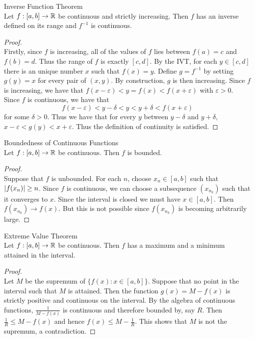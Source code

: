 \documentclass[a4paper]{article}
\begin{document}
\begin{prp}{Inverse Function Theorem}{}\\ Let $f:[a,b]\to\mathbb{R}$ be continuous and strictly increasing. Then $f$ has an inverse defined on its range and $f^{-1}$ is continuous. 
\begin{proof}\\ Firstly, since $f$ is increasing, all of the values of $f$ lies between $f(a)=c$ and $f(b)=d$. Thus the range of $f$ is exactly $[c,d]$. By the IVT, for each $y\in[c,d]$ there is an unique number $x$ such that $f(x)=y$. Define $g=f^{-1}$ by setting $g(y)=x$ for every pair of $(x,y)$. By construction, $g$ is then increasing. Since $f$ is increasing, we have that $f(x-\varepsilon)<y=f(x)<f(x+\varepsilon)$ with $\varepsilon>0$. Since $f$ is continuous, we have that $$f(x-\varepsilon)<y-\delta<y<y+\delta<f(x+\varepsilon)$$ for some $\delta>0$. Thus we have that for every $y$ between $y-\delta$ and $y+\delta$, $x-\varepsilon<g(y)<x+\varepsilon$. Thus the definition of continuity is satisfied. 
\end{proof}
\end{prp}

\begin{thm}{Boundedness of Continuous Functions}{}\\ Let $f:[a,b]\to\mathbb{R}$ be continuous. Then $f$ is bounded. 
\begin{proof}\\ Suppose that $f$ is unbounded. For each $n$, choose $x_n\in[a,b]$ such that $\abs{f(x_n)}\geq n$. Since $f$ is continuous, we can choose a subsequence $(x_{n_k})$ such that it converges to $x$. Since the interval is closed we must have $x\in[a,b]$. Then $f(x_{n_k})\to f(x)$. But this is not possible since $f(x_{n_k})$ is becoming arbitrarily large. 
\end{proof}
\end{thm}

\begin{thm}{Extreme Value Theorem}{}\\ Let $f:[a,b]\to\mathbb{R}$ be continuous. Then $f$ has a maximum and a minimum attained in the interval. 
\begin{proof}\\ Let $M$ be the supremum of $\{f(x):x\in[a,b]\}$. Suppose that no point in the interval such that $M$ is attained. Then the function $g(x)=M-f(x)$ is strictly positive and continuous on the interval. By the algebra of continuous functions, $\frac{1}{M-f(x)}$ is continuous and therefore bounded by, say $R$. Then $\frac{1}{R}\leq M-f(x)$ and hence $f(x)\leq M-\frac{1}{R}$. This shows that $M$ is not the supremum, a contradiction. 
\end{proof}
\end{thm}
\end{document}
